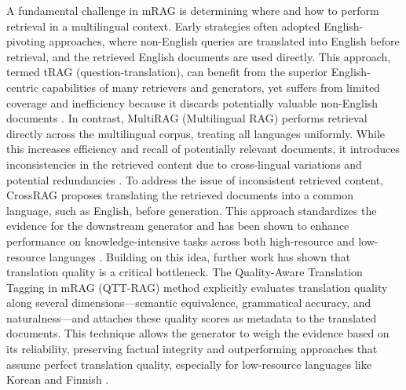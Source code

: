 \documentclass[11pt]{article}
\begin{document}
A fundamental challenge in mRAG is determining where and how to perform retrieval in a multilingual context. Early strategies often adopted English-pivoting approaches, where non-English queries are translated into English before retrieval, and the retrieved English documents are used directly. This approach, termed tRAG (question-translation), can benefit from the superior English-centric capabilities of many retrievers and generators, yet suffers from limited coverage and inefficiency because it discards potentially valuable non-English documents \cite{ref369}. In contrast, MultiRAG (Multilingual RAG) performs retrieval directly across the multilingual corpus, treating all languages uniformly. While this increases efficiency and recall of potentially relevant documents, it introduces inconsistencies in the retrieved content due to cross-lingual variations and potential redundancies \cite{ref369}. To address the issue of inconsistent retrieved content, CrossRAG proposes translating the retrieved documents into a common language, such as English, before generation. This approach standardizes the evidence for the downstream generator and has been shown to enhance performance on knowledge-intensive tasks across both high-resource and low-resource languages \cite{ref369}. Building on this idea, further work has shown that translation quality is a critical bottleneck. The Quality-Aware Translation Tagging in mRAG (QTT-RAG) method explicitly evaluates translation quality along several dimensions---semantic equivalence, grammatical accuracy, and naturalness---and attaches these quality scores as metadata to the translated documents. This technique allows the generator to weigh the evidence based on its reliability, preserving factual integrity and outperforming approaches that assume perfect translation quality, especially for low-resource languages like Korean and Finnish \cite{ref370}.
\end{document}
